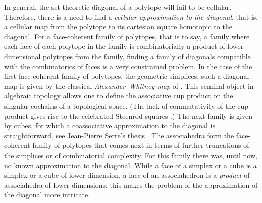 \documentclass[JEP,XML,SOM,Unicode,NoFloatCountersInSection]{cedram}
\theoremstyle{plain}
\theoremstyle{definition}
\begin{document}
In general, the set-theoretic diagonal of a polytope will fail to be cellular. Therefore, there is a need to find a \emph{cellular approximation to the diagonal}, that is, a cellular map from the polytope to its cartesian square homotopic to the diagonal. For a face-coherent family of polytopes, that is to say, a family where each face of each polytope in the family is combinatorially a product of lower-dimensional polytopes from the family, finding a family of diagonals compatible with the combinatorics of faces
is a very constrained problem.
In the case of the first face-coherent family of polytopes, the geometric simplices, such a diagonal map is given by the classical \emph{Alexander--Whitney map} of \cite{EilenbergZilber53, EilenbergMacLane54}. This seminal object in algebraic topology allows one to define the associative cup product on the singular cochains of a topological space.
(The lack of commutativity of the cup product gives rise to the celebrated Steenrod squares \cite{Steenrod47}.) The next family is given by cubes, for which a coassociative approximation to the diagonal is straightforward, see Jean-Pierre Serre's thesis \cite{Serre51}.
The associahedra form the face-coherent family of polytopes that comes next in terms of further truncations of the simplices or of combinatorial complexity.
For this family there was, until now, no known approximation to the diagonal.
While a face of a simplex or a cube is a simplex or a cube of lower dimension, a face of an associahedron is a \emph{product} of associahedra of lower dimensions; this makes the problem of the approximation of the diagonal more intricate.
\end{document}
